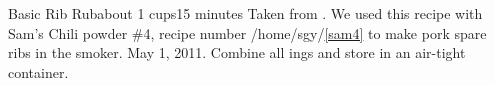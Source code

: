 \begin{recipe}{Basic Rib Rub}{about 1 cups}{15 minutes}
\freeform Taken from \emph{}. We used this recipe with Sam's Chili powder \#4, recipe number /home/sgy/\ref{sam4} to make pork spare ribs in the smoker.  May 1, 2011.
Combine all ings and store in an air-tight container.
\end{recipe}

